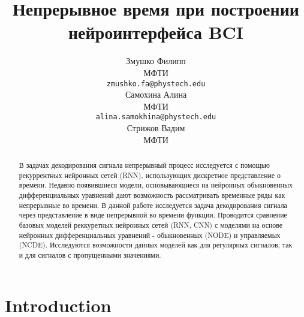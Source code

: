 \documentclass{article}
\title{Непрерывное время при построении нейроинтерфейса BCI}
\author{ Змушко Филипп \\
	МФТИ \\
	\texttt{zmushko.fa@phystech.edu} \\
	\And
	Самохина Алина \\
	МФТИ\\
	\texttt{alina.samokhina@phystech.edu} \\
	\And
	Стрижов Вадим \\
	МФТИ\\
}
\date{}
\begin{document}
\maketitle

\begin{abstract}
	В задачах декодирования сигнала непрерывный процесс исследуется с помощью рекуррентных нейронных сетей (RNN), использующих дискретное представление о времени. Недавно появившиеся модели, основывающиеся на нейронных обыкновенных дифференциальных уравнений дают возможность рассматривать временные ряды как непрерывные во времени.
    В данной работе исследуется задача декодирования сигнала через представление в виде непрерывной во времени функции. Проводится сравнение базовых моделей реккуретных нейронных сетей (RNN, CNN) с моделями на основе нейронных дифференциальных уравнений - обыкновенных (NODE) и управляемых (NCDE). Исследуются возможности данных моделей как для регулярных сигналов, так и для сигналов с пропущенными значениями. 
\end{abstract}



\section{Introduction}




\end{document}

